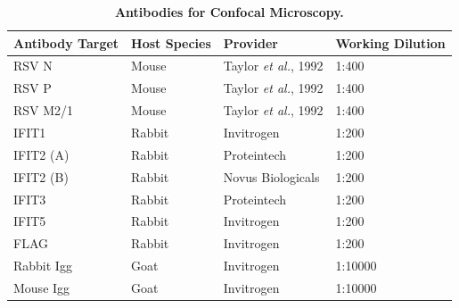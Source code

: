 \begin{table}
\centering
\begin{tabular}{llll}
\toprule
\textbf{Antibody Target} & \textbf{Host Species} & \textbf{Provider} & \textbf{Working Dilution} \\ \midrule
RSV N       & Mouse  & Taylor \textit{et al.}, 1992 \cite{Taylor1992ProtectiveAntibodies.}             & 1:400   \\
RSV P       & Mouse  & Taylor \textit{et al.}, 1992 \cite{Taylor1992ProtectiveAntibodies.}              & 1:400   \\
RSV   M2/1  & Mouse  & Taylor \textit{et al.}, 1992 \cite{Taylor1992ProtectiveAntibodies.}              & 1:400   \\
IFIT1       & Rabbit & Invitrogen        & 1:200   \\
IFIT2   (A) & Rabbit & Proteintech       & 1:200   \\
IFIT2 (B)   & Rabbit & Novus Biologicals & 1:200   \\
IFIT3       & Rabbit & Proteintech       & 1:200   \\
IFIT5       & Rabbit & Invitrogen              & 1:200   \\
FLAG        & Rabbit & Invitrogen              & 1:200   \\
Rabbit Igg  & Goat   & Invitrogen              & 1:10000 \\
Mouse   Igg & Goat   & Invitrogen              & 1:10000 \\ \bottomrule
\end{tabular}
\caption[Antibodies for Confocal Microscopy.]{\textbf{Antibodies for Confocal Microscopy.}}
\label{tab:Antibodies for Confocal Microscopy}
\end{table}

